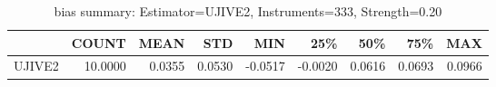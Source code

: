 \begin{table}[ht]
\centering
\caption{bias summary: Estimator=UJIVE2, Instruments=333, Strength=0.20}
\begin{tabular}{lrrrrrrrr}
\toprule
 & COUNT & MEAN & STD & MIN & 25\% & 50\% & 75\% & MAX \\
\midrule
UJIVE2 & 10.0000 & 0.0355 & 0.0530 & -0.0517 & -0.0020 & 0.0616 & 0.0693 & 0.0966 \\
\bottomrule
\end{tabular}
\end{table}
